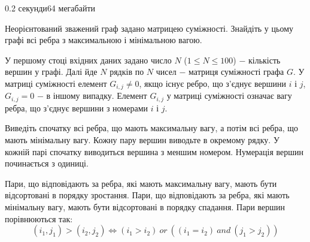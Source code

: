 \begin{problem}{}{}{}{0.2 секунди}{64 мегабайти}

Неорієнтований зважений граф задано матрицею суміжності. Знайдіть у цьому графі всі ребра з максимальною і мінімальною вагою.

\InputFile
У першому стоці вхідних даних задано число $N$ ($1 \le N \le 100$) $-$ кількість вершин у графі.
Далі йде $N$ рядків по $N$ чисел $-$ матриця суміжності графа $G$.
У матриці суміжності елемент $G_{i,j} \ne 0$, якщо існує ребро, що з'єднує вершини $i$ і $j$, $G_{i,j}=0$ $-$ в іншому випадку.
Елемент $G_{i,j}$ у матриці суміжності означає вагу ребра, що з'єднує вершини з номерами $i$ і $j$.

\OutputFile
Виведіть спочатку всі ребра, що мають максимальну вагу, а потім всі ребра, що мають мінімальну вагу.
Кожну пару вершин виводьте в окремому рядку. У кожній парі спочатку виводиться вершина з меншим номером.
Нумерація вершин починається з одиниці.

Пари, що відповідають за ребра, які мають максимальну вагу, мають бути відсортовані в порядку зростання.
Пари, що відповідають за ребра, які мають мінімальну вагу, мають бути відсортовані в порядку спадання.
Пари вершин порівнюються так: 
$$ (i_1, j_1) > (i_2, j_2) \Leftrightarrow (i_1 > i_2) \ or \ ((i_1=i_2) \ and \ (j_1>j_2))$$

\Example

\begin{example}
\end{example}

\end{problem}
